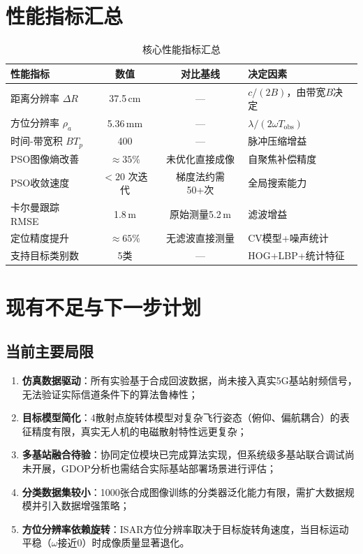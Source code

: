 \documentclass[12pt, a4paper]{article}
\begin{document}
\section{性能指标汇总}

\begin{table}[H]
\centering
\begin{tabularx}{\textwidth}{lCCL}
\toprule
{}\color{white}\bfseries 性能指标 &
  \color{white}\bfseries 数值 &
  \color{white}\bfseries 对比基线 &
  \color{white}\bfseries 决定因素 \\
\midrule
距离分辨率 $\Delta R$ & 37.5\,cm & --- & $c/(2B)$，由带宽$B$决定 \\
方位分辨率 $\rho_a$ & 5.36\,mm & --- & $\lambda/(2\omega T_\mathrm{obs})$ \\
时间-带宽积 $BT_p$ & 400 & --- & 脉冲压缩增益 \\
PSO图像熵改善 & $\approx 35\%$ & 未优化直接成像 & 自聚焦补偿精度 \\
PSO收敛速度 & $<20$ 次迭代 & 梯度法约需50+次 & 全局搜索能力 \\
卡尔曼跟踪RMSE & 1.8\,m & 原始测量5.2\,m & 滤波增益 \\
定位精度提升 & $\approx 65\%$ & 无滤波直接测量 & CV模型+噪声统计 \\
支持目标类别数 & 5类 & --- & HOG+LBP+统计特征 \\
\bottomrule
\end{tabularx}
\caption{核心性能指标汇总}
\label{tab:performance}
\end{table}

\section{现有不足与下一步计划}

\subsection{当前主要局限}

\begin{enumerate}
  \item \textbf{仿真数据驱动}：所有实验基于合成回波数据，尚未接入真实5G基站射频信号，无法验证实际信道条件下的算法鲁棒性；
  \item \textbf{目标模型简化}：4散射点旋转体模型对复杂飞行姿态（俯仰、偏航耦合）的表征精度有限，真实无人机的电磁散射特性远更复杂；
  \item \textbf{多基站融合待验}：协同定位模块已完成算法实现，但系统级多基站联合调试尚未开展，GDOP分析也需结合实际基站部署场景进行评估；
  \item \textbf{分类数据集较小}：1000张合成图像训练的分类器泛化能力有限，需扩大数据规模并引入数据增强策略；
  \item \textbf{方位分辨率依赖旋转}：ISAR方位分辨率取决于目标旋转角速度，当目标运动平稳（$\omega$接近0）时成像质量显著退化。
\end{enumerate}
\end{document}
